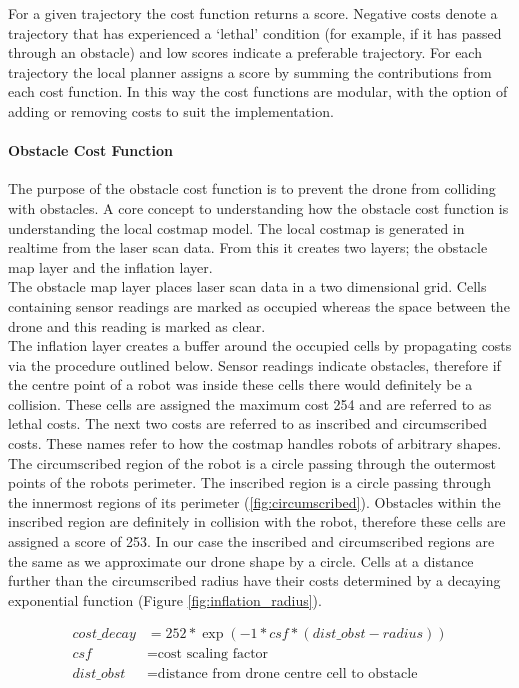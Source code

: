\documentclass[capstone_report.tex]{subfiles}
\begin{document}
For a given trajectory the cost function returns a score. Negative costs denote a trajectory that has experienced a `lethal' condition (for example, if it has passed through an obstacle) and low scores indicate a preferable trajectory.  For each trajectory the local planner assigns a score by summing the contributions from each cost function.   In this way the cost functions are modular, with the option of adding or removing costs to suit the implementation.  

\paragraph{Obstacle Cost Function}  
The purpose of the obstacle cost function is to prevent the drone from colliding with obstacles. A core concept to understanding how the obstacle cost function is understanding the local costmap model.  The local costmap is generated in realtime from the laser scan data.  From this it creates two layers; the obstacle map layer and the inflation layer. \\

The obstacle map layer places laser scan data in a two dimensional grid.  Cells containing sensor readings are marked as occupied whereas the space between the drone and this reading is marked as clear.\\

The inflation layer creates a buffer around the occupied cells by propagating costs via the procedure outlined below.  Sensor readings indicate obstacles, therefore if the centre point of a robot was inside these cells there would definitely be a collision. These cells are assigned the maximum cost 254 and are referred to as lethal costs.  The next two costs are referred to as inscribed and circumscribed costs.  These names refer to how the costmap handles robots of arbitrary shapes.  The circumscribed region of the robot is a circle passing through the outermost points of the robots perimeter.  The inscribed region is a circle passing through the innermost regions of its perimeter (\ref{fig:circumscribed}).  Obstacles within the inscribed region are definitely in collision with the robot, therefore these cells are assigned a score of 253.  In our case the inscribed and circumscribed regions are the same as we approximate our drone shape by a circle.  Cells at a distance further than the circumscribed radius have their costs determined by a decaying exponential function (Figure \ref{fig:inflation_radius}).

\begin{align*}
    cost\_decay &= 252*\exp(-1 * csf * (dist\_obst - radius))\\
    csf &=    \text{cost scaling factor}\\
    dist\_obst &=    \text{distance from drone centre cell to obstacle}
\end{align*}
\end{document}
